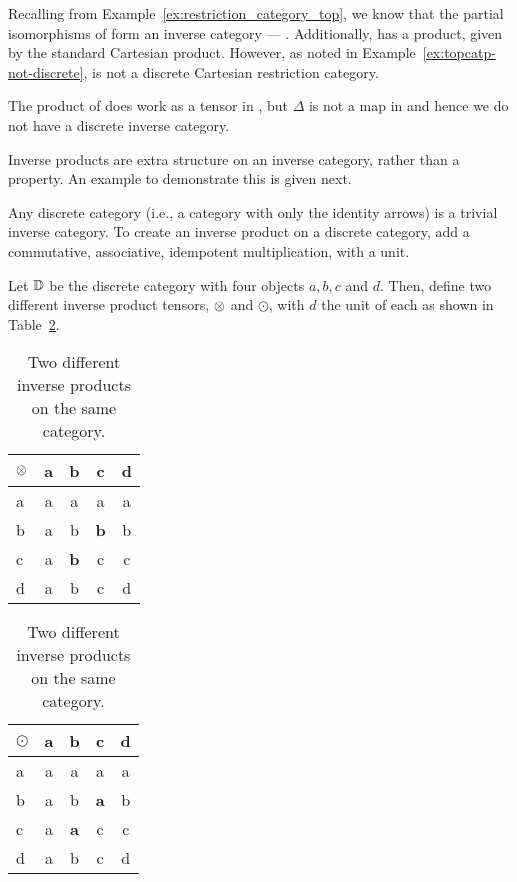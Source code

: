 \begin{example}\label{ex:topcat_does_not_give_a_discrete_inverse_category}
  Recalling \topcatp from Example~\ref{ex:restriction_category_top}, we know that the partial
  isomorphisms of \topcatp form an inverse category --- \Inv{\topcatp}. Additionally, \topcatp has a
  product, given by the standard Cartesian product. However, as noted in
  Example~\ref{ex:topcatp-not-discrete}, \topcatp is not a discrete Cartesian restriction category.

  The product of \topcatp does work as a tensor in \Inv{\topcatp}, but $\Delta$  is not a map in
  \Inv{\topcat} and hence we do not have a discrete inverse  category.
\end{example}

Inverse products are extra structure on an inverse category, rather than a property. An example to
demonstrate this is given next.

\begin{example}
  \label{example:invprodisstructure}
\end{example}
Any discrete category (i.e., a category with only the identity arrows) is a trivial inverse
category. To create an inverse product on a discrete category, add a commutative, associative,
idempotent multiplication, with a unit.

Let $\mathbb{D}$ be the discrete category with four objects $a,b,c$ and $d$. Then, define
two different inverse product tensors, $\otimes$ and $\odot$, with $d$ the unit of each as shown in
Table~\ref{tab:two_different_inverse_products}.

\begin{table}[!htbp]
  \begin{center}
  \begin{tabular}{|l||c|c|c|c|}
    \hline
    $\otimes$&a&b&c&d\\ \hline \hline
    a&a&a&a&a\\ \hline
    b&a&b&\textbf{b}&b\\ \hline
    c&a&\textbf{b}&c&c \\ \hline
    d&a&b&c&d \\ \hline
  \end{tabular}
  \qquad
  \begin{tabular}{|l||c|c|c|c|} \hline
    $\odot$&a&b&c&d\\ \hline \hline
    a&a&a&a&a\\ \hline
    b&a&b&\textbf{a}&b\\ \hline
    c&a&\textbf{a}&c&c \\ \hline
    d&a&b&c&d \\ \hline
  \end{tabular}
  \end{center}
  \caption{Two different inverse products on the same category.}
  \label{tab:two_different_inverse_products}
\end{table}

